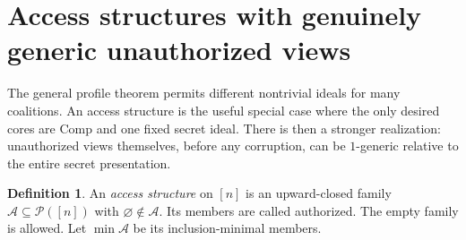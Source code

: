 \documentclass[11pt,letterpaper]{article}
\theoremstyle{plain}
\theoremstyle{definition}
\newtheorem{definition}[theorem]{Definition}
\theoremstyle{remark}
\numberwithin{equation}{section}
\newcommand{\Comp}{\mathrm{Comp}}
\newcommand{\Acal}{\mathcal A}
\begin{document}
\section{Access structures with genuinely generic unauthorized views}\label{cr11:sec:access}

The general profile theorem permits different nontrivial ideals for many
coalitions. An access structure is the useful special case where the only
desired cores are $\Comp$ and one fixed secret ideal. There is then a
stronger realization: unauthorized views themselves, before any corruption,
can be $1$-generic relative to the entire secret presentation.

\begin{definition}
An \emph{access structure} on $[n]$ is an upward-closed family
$\Acal\subseteq\mathcal P([n])$ with $\varnothing\notin\Acal$. Its members
are called authorized. The empty family is allowed. Let
$\min\Acal$ be its inclusion-minimal members.
\end{definition}
\end{document}
